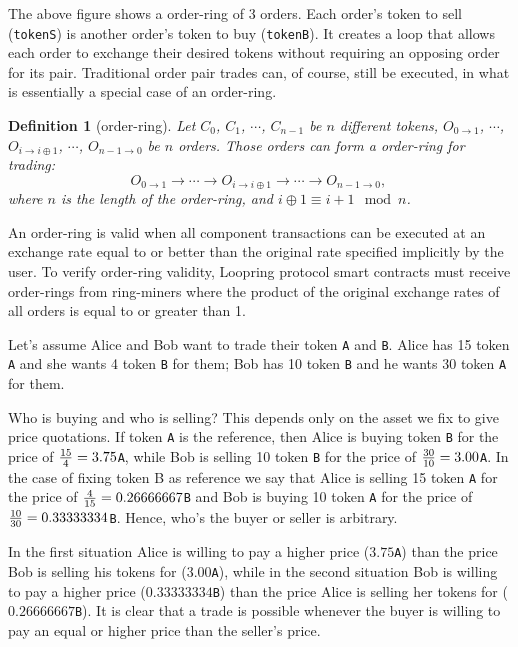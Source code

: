\documentclass[UTF8,nofonts]{article}
\newtheorem{definition}{Definition}[section]
\begin{document}
\begin{multicols}{2}
The above figure shows a order-ring of 3 orders. Each order's token to sell (\verb|tokenS|) is another order's token to buy (\verb|tokenB|). It creates a loop that allows each order to exchange their desired tokens without requiring an opposing order for its pair. Traditional order pair trades can, of course, still be executed, in what is essentially a special case of an order-ring. 

\begin{definition}[order-ring] Let $C_{0}$, $C_{1}$, $\cdots$, $C_{n-1}$ be $n$ different tokens, $O_{0\rightarrow 1}$, $\cdots$, $O_{i\rightarrow i\oplus 1}$, $\cdots$, $O_{n-1 \rightarrow 0}$ be $n$ orders. Those orders can form a order-ring for trading:
$$O_{0\rightarrow 1} \rightarrow \cdots \rightarrow O_{i\rightarrow i\oplus 1} \rightarrow \cdots \rightarrow O_{n-1\rightarrow 0} \text{, }$$
where $n$ is the length of the order-ring, and $i\oplus 1 \equiv i+1 \mod n$.
\end{definition}

An order-ring is valid when all component transactions can be executed at an exchange rate equal to or better than the original rate specified implicitly by the user. To verify order-ring validity, Loopring protocol smart contracts must receive order-rings from ring-miners where the product of the original exchange rates of all orders is equal to or greater than 1.

Let's assume Alice and Bob want to trade their token \verb|A| and \verb|B|. Alice has 15 token \verb|A| and she wants 4 token \verb|B| for them; Bob has 10 token \verb|B|  and he wants 30 token \verb|A| for them.

Who is buying and who is selling? This depends only on the asset we fix to give price quotations. If token \verb|A| is the reference, then Alice is buying token \verb|B| for the price of ${15 \over 4} = 3.75$\verb|A|, while Bob is selling 10 token \verb|B| for the price of ${30 \over 10} = 3.00$\verb|A|. In the case of fixing token B as reference we say that Alice is selling 15 token \verb|A| for the price of ${4\over 15}=0.26666667$\verb|B| and Bob is buying 10 token \verb|A| for the price of ${10 \over 30}=0.33333334$\verb|B|. Hence, who's the buyer or seller is arbitrary.

In the first situation Alice is willing to pay a higher price ($3.75$\verb|A|) than the price Bob is selling his tokens for ($3.00$\verb|A|), while in the second situation Bob is willing to pay a higher price ($0.33333334$\verb|B|) than the price Alice is selling her tokens for ($0.26666667$\verb|B|). It is clear that a trade is possible whenever the buyer is willing to pay an equal or higher price than the seller's price.


\end{multicols}
\end{document}
